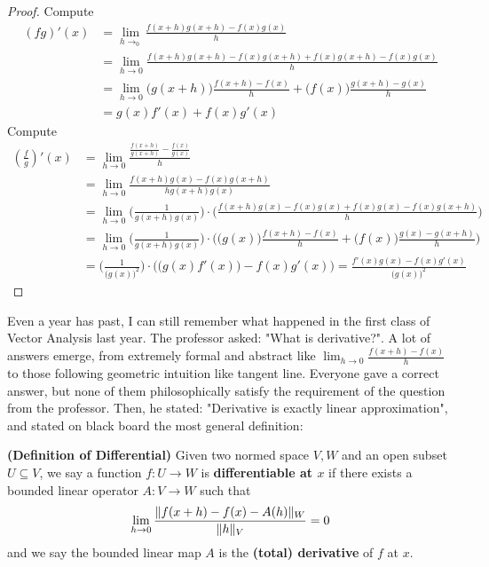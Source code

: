\documentclass{report}
\begin{document}
\begin{proof}
Compute 
\begin{align*}
  (fg)'(x)&=\lim_{h\to_0} \frac{f(x+h)g(x+h)-f(x)g(x)}{h}\\
          &=\lim_{h\to 0} \frac{f(x+h)g(x+h)-f(x)g(x+h)+f(x)g(x+h)-f(x)g(x)}{h}\\
          &=\lim_{h\to0} \big(g(x+h) \big) \frac{f(x+h)-f(x)}{h} + \big(f(x) \big) \frac{g(x+h)-g(x)}{h}\\
          &=g(x)f'(x)+f(x)g'(x)
\end{align*}
Compute 
\begin{align*}
  (\frac{f}{g})'(x)&=\lim_{h\to0} \frac{\frac{f(x+h)}{g(x+h)}-\frac{f(x)}{g(x)}}{h}\\
  &=\lim_{h\to0} \frac{f(x+h)g(x)-f(x)g(x+h)}{h g(x+h)g(x)}\\
  &=\lim_{h\to0}\big(\frac{1}{g(x+h)g(x)} \big)\cdot \big(\frac{f(x+h)g(x)-f(x)g(x)+f(x)g(x)-f(x)g(x+h)}{h} \big)\\
  &=\lim_{h\to 0} \Big(\frac{1}{g(x+h)g(x)} \Big) \cdot \Big(\big(g(x) \big) \frac{f(x+h)-f(x)}{h} +\big(f(x) \big) \frac{g(x)-g(x+h)}{h}\Big)\\
  &=\Big(\frac{1}{\big(g(x) \big)^2} \Big)\cdot \Big(\big(g(x)f'(x) \big)-f(x)g'(x) \Big)=\frac{f'(x)g(x)-f(x)g'(x)}{\big(g(x) \big)^2}
\end{align*}
\end{proof}
\begin{mdframed}
  Even a year has past, I can still remember what happened in the first class of Vector Analysis last year. The professor asked: "What is derivative?". A lot of answers emerge, from extremely formal and abstract like $\lim_{h\to 0}\frac{f(x+h)-f(x)}{h}$ to those following geometric intuition like tangent line. Everyone gave a correct answer, but none of them philosophically satisfy the requirement of the question from the professor. Then, he stated: "Derivative is exactly linear approximation", and stated on black board the most general definition:


\end{mdframed}
\begin{definition}
\label{4}
  \textbf{(Definition of Differential)} Given two normed space $V,W$ and an open subset $U\subseteq V$,  we say a function $f:U\rightarrow W$ is \textbf{differentiable at $x$} if there exists a bounded linear operator $A:V\rightarrow W$ such that 
\begin{align*}
\lim_{ h\to 0} \frac{\| f(x+h)-f(x)-A(h) \|_W}{\| h \|_V}=0
\end{align*}
and we say the bounded linear map $A$ is the \textbf{(total) derivative} of $f$ at  $x$. 
\end{definition}
\end{document}
